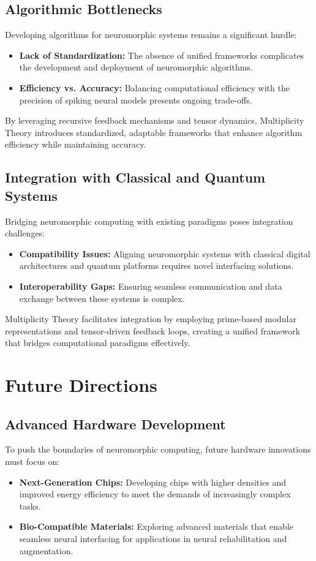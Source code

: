 \documentclass{article}
\theoremstyle{plain}
\begin{document}
\subsection{Algorithmic Bottlenecks}
Developing algorithms for neuromorphic systems remains a significant hurdle:
\begin{itemize}
    \item \textbf{Lack of Standardization:} The absence of unified frameworks complicates the development and deployment of neuromorphic algorithms.
    \item \textbf{Efficiency vs. Accuracy:} Balancing computational efficiency with the precision of spiking neural models presents ongoing trade-offs.
\end{itemize}
By leveraging recursive feedback mechanisms and tensor dynamics, Multiplicity Theory introduces standardized, adaptable frameworks that enhance algorithm efficiency while maintaining accuracy.

\subsection{Integration with Classical and Quantum Systems}
Bridging neuromorphic computing with existing paradigms poses integration challenges:
\begin{itemize}
    \item \textbf{Compatibility Issues:} Aligning neuromorphic systems with classical digital architectures and quantum platforms requires novel interfacing solutions.
    \item \textbf{Interoperability Gaps:} Ensuring seamless communication and data exchange between these systems is complex.
\end{itemize}
Multiplicity Theory facilitates integration by employing prime-based modular representations and tensor-driven feedback loops, creating a unified framework that bridges computational paradigms effectively.


\section{Future Directions}

\subsection{Advanced Hardware Development}
To push the boundaries of neuromorphic computing, future hardware innovations must focus on:
\begin{itemize}
    \item \textbf{Next-Generation Chips:} Developing chips with higher densities and improved energy efficiency to meet the demands of increasingly complex tasks.
    \item \textbf{Bio-Compatible Materials:} Exploring advanced materials that enable seamless neural interfacing for applications in neural rehabilitation and augmentation.
\end{itemize}
\end{document}
